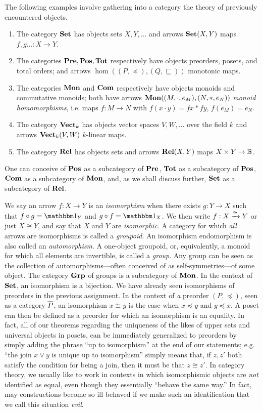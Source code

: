 \begin{ex} The following examples involve gathering into a category the theory of previously encountered objects.

\begin{enumerate} 
\item The category $\mathbf{Set}$ has objects sets $X,Y,\dots $ and arrows $\mathbf{Set}(X,Y)$ maps $f,g\dots :X\to Y$.
\item The categories $\mathbf{Pre},\mathbf{Pos},\mathbf{Tot}$ respectively have objects preorders, posets, and total orders; and arrows $\hom((P,\preceq),(Q,\sqsubseteq))$ monotonic maps.
\item The categories $\mathbf{Mon}$ and $\mathbf{Com}$ respectively have objects monoids and commutative monoids; both have arrows $\mathbf{Mon}((M,\cdot,e_M),(N,*,e_N))$ \emph{monoid homomorphisms}, i.e. maps $f:M\to N$ with $f(x\cdot y)=fx*fy$, $f(e_M)=e_N$.
\item The category $\mathbf{Vect}_k$ has objects vector spaces $V,W,\dots$ over the field $k$ and arrows $\mathbf{Vect}_k(V,W)$ $k$-linear maps.
\item The category $\mathbf{Rel}$ has objects sets and arrows $\mathbf{Rel}(X,Y)$ maps $X\times Y\to\mathbb B$.
\end{enumerate}

\end{ex}

One can conceive of $\mathbf{Pos}$ as a subcategory of $\mathbf{Pre}$, $\mathbf{Tot}$ as a subcategory of $\mathbf{Pos}$, $\mathbf{Com}$ as a subcategory of $\mathbf{Mon}$, and, as we shall discuss further, $\mathbf{Set}$ as a subcategory of $\mathbf{Rel}$. 

We say an arrow $f:X\to Y$ is an \emph{isomorphism} when there exists $g:Y\to X$ such that $f\circ g =\Id{Y}$ and $g\circ f=\Id{X}$. We then write $f:X\xrightarrow{\cong}Y$ or just $X\cong Y$, and say that $X$ and $Y$ are \emph{isomorphic}. A category for which \emph{all} arrows are isomorphisms is called a \emph{groupoid}. An isomorphism endomorphism is also called an \emph{automorphism}. A one-object groupoid, or, equivalently, a monoid for which all elements are invertible, is called a \emph{group}. Any group can be seen as the collection of automorphisms---often conceived of as self-symmetries---of some object. The category $\mathbf{Grp}$ of groups is a subcategory of $\mathbf{Mon}$. In the context of $\mathbf{Set}$, an isomorphism is a bijection. We have already seen isomorphisms of preorders in the previous assignment. In the context of \emph{a} preorder $(P,\preceq)$, seen as a category $\overline{P}$, an isomorphism $x\cong y$ is the case when $x\preceq y$ and $y\preceq x$. A poset can then be defined as a preorder for which an isomorphism is an equality. In fact, all of our theorems regarding the uniqueness of the likes of upper sets and universal objects in posets, can be immediately generalized to preorders by simply adding the phrase ``up to isomorphism'' at the end of our statements; e.g. ``the join $x\vee y$ is unique up to isomorphism'' simply means that, if $z,z'$ both satisfy the condition for being a join, then it must be that $z\cong z'$. In category theory, we usually like to work in contexts in which isomorphismic objects are \emph{not} identified as equal, even though they essentially ``behave the same way.'' In fact, may constructions become so ill behaved if we make such an identification that we call this situation \emph{evil}.

